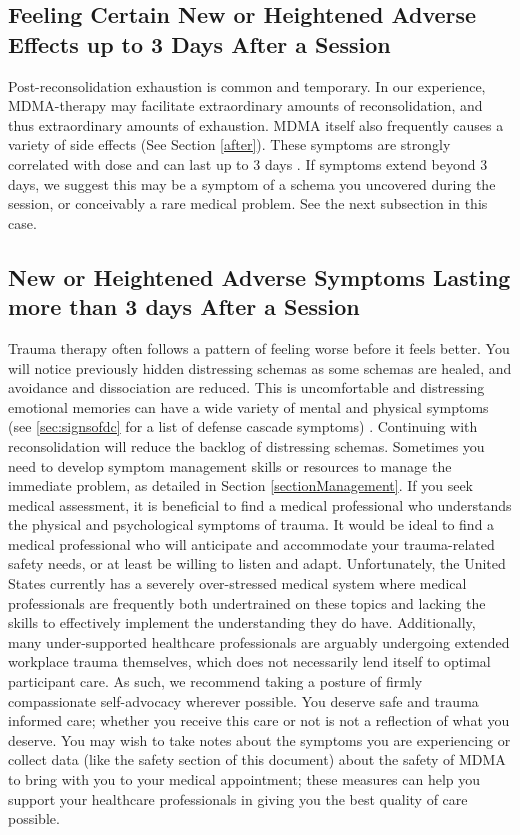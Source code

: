 \documentclass[12pt,letterpaper]{book}
\begin{document}
\subsection*{Feeling Certain New or Heightened Adverse Effects up to 3 Days After a Session}
Post-reconsolidation exhaustion is common and temporary. In our experience, MDMA-therapy may facilitate extraordinary amounts of reconsolidation, and thus extraordinary amounts of exhaustion. MDMA itself also frequently causes a variety of side effects (See Section \ref{after}). These symptoms are strongly correlated with dose and can last up to 3 days \cite{liechtiGender}. If symptoms extend beyond 3 days, we suggest this may be a symptom of a schema you uncovered during the session, or conceivably a rare medical problem. See the next subsection in this case.
\subsection*{New or Heightened Adverse Symptoms Lasting more than 3 days After a Session}
Trauma therapy often follows a pattern of feeling worse before it feels better. You will notice previously hidden distressing schemas as some schemas are healed, and avoidance and dissociation are reduced. This is uncomfortable and distressing emotional memories can have a wide variety of mental and physical symptoms (see \ref{sec:signsofdc} for a list of defense cascade symptoms) \cite{kroenkeSomatic,henningsenSomatic}. Continuing with reconsolidation will reduce the backlog of distressing schemas. Sometimes you need to develop symptom management skills or resources to manage the immediate problem, as detailed in Section \ref{sectionManagement}. If you seek medical assessment, it is beneficial to find a medical professional who understands the physical and psychological symptoms of trauma. It would be ideal to find a medical professional who will anticipate and accommodate your trauma-related safety needs, or at least be willing to listen and adapt. Unfortunately, the United States currently has a severely over-stressed medical system where medical professionals are frequently both undertrained on these topics and lacking the skills to effectively implement the understanding they do have. Additionally, many under-supported healthcare professionals are arguably undergoing extended workplace trauma themselves, which does not necessarily lend itself to optimal participant care. As such, we recommend taking a posture of firmly compassionate self-advocacy wherever possible. You deserve safe and trauma informed care; whether you receive this care or not is not a reflection of what you deserve. You may wish to take notes about the symptoms you are experiencing or collect data (like the safety section of this document) about the safety of MDMA to bring with you to your medical appointment; these measures can help you support your healthcare professionals in giving you the best quality of care possible.
\end{document}
